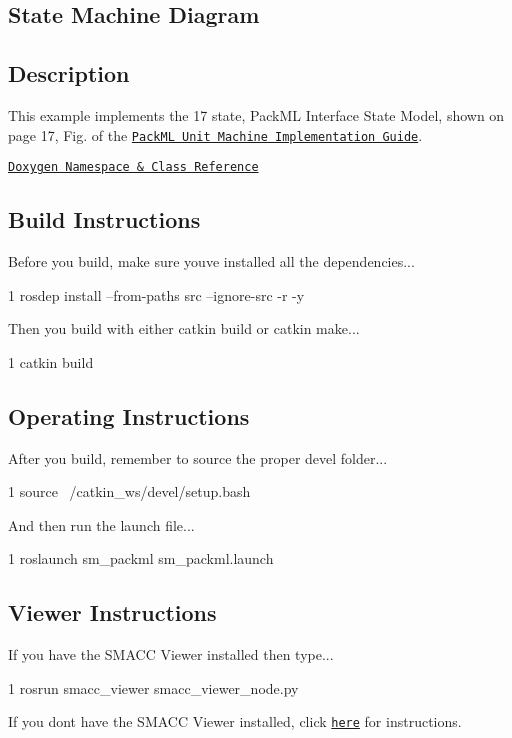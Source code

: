 \subsection*{State Machine Diagram}



\subsection*{Description}

This example implements the 17 state, Pack\+ML Interface State Model, shown on page 17, Fig. of the \href{http://omac.org/wp-content/uploads/2016/11/PackML_Unit_Machine_Implementation_Guide-V1-00.pdf}{\tt Pack\+ML Unit Machine Implementation Guide}.~\newline


\href{https://reelrbtx.github.io/SMACC_Documentation/master/html/namespacesm__packml.html}{\tt Doxygen Namespace \& Class Reference}

\subsection*{Build Instructions}

Before you build, make sure you\textquotesingle{}ve installed all the dependencies...


\begin{DoxyCode}
1 rosdep install --from-paths src --ignore-src -r -y 
\end{DoxyCode}


Then you build with either catkin build or catkin make...


\begin{DoxyCode}
1 catkin build
\end{DoxyCode}


\subsection*{Operating Instructions}

After you build, remember to source the proper devel folder...


\begin{DoxyCode}
1 source ~/catkin\_ws/devel/setup.bash
\end{DoxyCode}


And then run the launch file...


\begin{DoxyCode}
1 roslaunch sm\_packml sm\_packml.launch
\end{DoxyCode}


\subsection*{Viewer Instructions}

If you have the S\+M\+A\+CC Viewer installed then type...


\begin{DoxyCode}
1 rosrun smacc\_viewer smacc\_viewer\_node.py
\end{DoxyCode}


If you don\textquotesingle{}t have the S\+M\+A\+CC Viewer installed, click \href{http://smacc.ninja/smacc-viewer/}{\tt here} for instructions. 